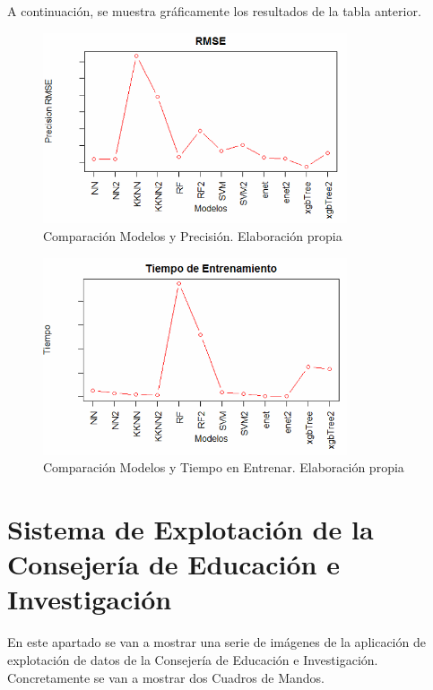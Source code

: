 \begin{subappendices}
A continuación, se muestra gráficamente los resultados de la tabla anterior.

\begin{figure}[htb]
	\centering
	\caption{Comparación Modelos y Precisión. Elaboración propia}
	\label{fig:ComparacionModelosII}
	\includegraphics[width=0.8\textwidth]{recursos/ImagenesR/ComparacionModelos2}
\end{figure}
\FloatBarrier

\begin{figure}[htb]
	\centering
	\caption{Comparación Modelos y Tiempo en Entrenar. Elaboración propia}
	\label{fig:ComparacionModelosTiempo}
	\includegraphics[width=0.8\textwidth]{recursos/ImagenesR/ComparacionModelosTiempo}
\end{figure}
\FloatBarrier
\end{subappendices}

\chapter{Sistema de Explotación de la Consejería de Educación e Investigación}
\setcounter{figure}{0} \renewcommand{\thefigure}{C.\arabic{figure}}
\setcounter{table}{0} \renewcommand{\thetable}{C.\arabic{table}}
	\label{appendix:C}
En este apartado se van a mostrar una serie de imágenes de la aplicación de explotación de datos de la Consejería de Educación e Investigación. Concretamente se van a mostrar dos Cuadros de Mandos.

